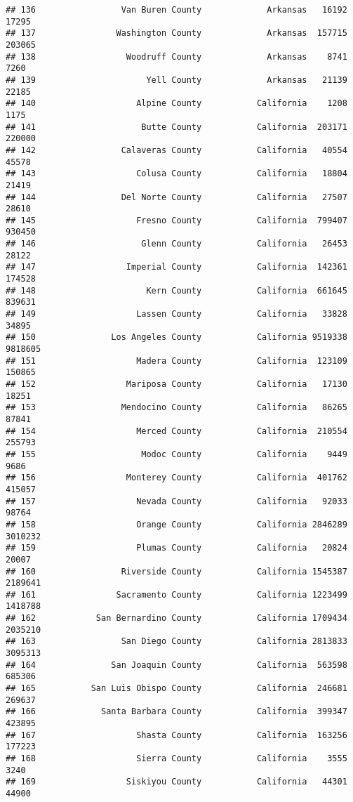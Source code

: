 \documentclass[
]{article}
\begin{document}
\begin{verbatim}
## 136                 Van Buren County             Arkansas   16192   17295
## 137                Washington County             Arkansas  157715  203065
## 138                  Woodruff County             Arkansas    8741    7260
## 139                      Yell County             Arkansas   21139   22185
## 140                    Alpine County           California    1208    1175
## 141                     Butte County           California  203171  220000
## 142                 Calaveras County           California   40554   45578
## 143                    Colusa County           California   18804   21419
## 144                 Del Norte County           California   27507   28610
## 145                    Fresno County           California  799407  930450
## 146                     Glenn County           California   26453   28122
## 147                  Imperial County           California  142361  174528
## 148                      Kern County           California  661645  839631
## 149                    Lassen County           California   33828   34895
## 150               Los Angeles County           California 9519338 9818605
## 151                    Madera County           California  123109  150865
## 152                  Mariposa County           California   17130   18251
## 153                 Mendocino County           California   86265   87841
## 154                    Merced County           California  210554  255793
## 155                     Modoc County           California    9449    9686
## 156                  Monterey County           California  401762  415057
## 157                    Nevada County           California   92033   98764
## 158                    Orange County           California 2846289 3010232
## 159                    Plumas County           California   20824   20007
## 160                 Riverside County           California 1545387 2189641
## 161                Sacramento County           California 1223499 1418788
## 162            San Bernardino County           California 1709434 2035210
## 163                 San Diego County           California 2813833 3095313
## 164               San Joaquin County           California  563598  685306
## 165           San Luis Obispo County           California  246681  269637
## 166             Santa Barbara County           California  399347  423895
## 167                    Shasta County           California  163256  177223
## 168                    Sierra County           California    3555    3240
## 169                  Siskiyou County           California   44301   44900

\end{verbatim}
\end{document}

